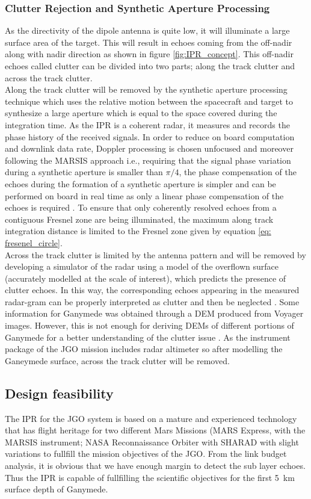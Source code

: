 \subsubsection{Clutter Rejection and Synthetic Aperture Processing}
\label{SAR}
As the directivity of the dipole antenna is quite low, it will illuminate a large surface area of the target. This will result in echoes coming from the off-nadir along with nadir direction as shown in figure \ref{fig:IPR_concept}. This off-nadir echoes called clutter can be divided into two parts; along the track clutter and across the track clutter.\\
%
Along the track clutter will be removed by the synthetic aperture processing technique which uses the relative motion between the spacecraft and target to synthesize a large aperture which is equal to the space covered during the integration time. As the \ac{IPR} is a coherent radar, it measures and records the phase history of the received signals. In order to reduce on board computation and downlink data rate, Doppler processing is chosen unfocused and moreover following the \ac{MARSIS} approach i.e., requiring that the signal phase variation during a synthetic aperture is smaller than $\pi/4$, the phase compensation of the echoes during the formation of a synthetic aperture is simpler and can be performed on board in real time as only a linear phase compensation of the echoes is required \cite{Gany_SRS}. To ensure that only coherently resolved echoes from a contiguous Fresnel zone are being illuminated, the maximum along track integration distance is limited to the Fresnel zone given by equation \ref{eq:
fresenel_circle}.
\\
Across the track clutter is limited by the antenna pattern and will be removed by developing a simulator of the radar using a model of the overflown surface (accurately modelled at the scale of interest), which predicts the presence of clutter echoes. In this way, the corresponding echoes appearing in the measured radar-gram can be properly interpreted as clutter and then be neglected \cite{SHARAD}. Some information for Ganymede was obtained through a \ac{DEM} produced from Voyager images. However, this is not enough  for deriving \acp{DEM} of different portions of Ganymede for a better understanding of the clutter issue \cite{Gany_SRS}. As the instrument package of the \ac{JGO} mission includes radar altimeter so after modelling the Ganeymede surface, across the track clutter will be removed.
\subsection{Design feasibility}
The \ac{IPR} for the \ac{JGO} system is based on a mature and experienced technology that has flight heritage for two different Mars Missions (MARS Express, with the \ac{MARSIS} instrument; NASA Reconnaissance Orbiter with \ac{SHARAD} with slight variations to fullfill  the mission objectives of the \ac{JGO}. From the link budget analysis, it is obvious that we have enough margin to detect the sub layer echoes.  Thus the \ac{IPR} is capable of fullfilling the scientific objectives for the first 5~km surface depth of Ganymede.
